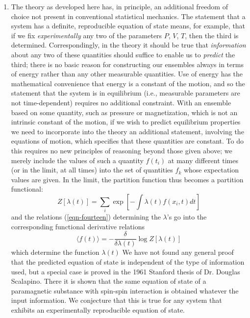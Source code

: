 \documentclass[]{article}
\begin{document}
\begin{enumerate}
\item The theory as developed here has, in principle, an additional freedom of choice not present in conventional statistical mechanics. The statement that a system has a definite, reproducible equation of state means, for example, that if we fix \emph{experimentally} any two of the parameters $P$, $V$, $T$, then the third is determined. Correspondingly, in the theory it should be true that \emph{information} about any two of these quantities should suffice to enable us to \emph{predict} the third; there is no basic reason for constructing our ensembles always in terms of energy rather than any other measurable quantities. Use of energy has the mathematical convenience that energy is a constant of the motion, and so the statement that the system is in equilibrium (i.e., measurable parameters are not time-dependent) requires no additional constraint. With an ensemble based on some quantity, such as pressure or magnetization, which is not an intrinsic constant of the motion, if we wish to predict equilibrium properties we need to incorporate into the theory an additional statement, involving the equations of motion, which specifies that these quantities are constant. To do this requires no new principles of reasoning beyond those given above; we merely include the values of such a quantity $f \left( t _{ i }\right)$ at many different times (or in the limit, at all times) into the set of quantities $f _{ k }$ whose expectation values are given. In the limit, the partition function thus becomes a partition functional:
\begin{equation}
Z [\lambda( t )]=\sum_{ i } \exp \left[-\int \lambda( t ) f \left( x _{ i }, t \right) d t \right] \label{eqn-fifty}
\end{equation}
and the relations (\ref{eqn-fourteen}) determining the $\lambda$'s go into the corresponding functional derivative relations
\begin{equation}
\langle f(t)\rangle=-\frac{\delta}{\delta \lambda(t)} \log Z[\lambda(t)] \label{eqn-fifty-one}
\end{equation}
which determine the function $\lambda(t)$ We have not found any general proof that the predicted equation of state is independent of the type of information used, but a special case is proved in the 1961 Stanford thesis of Dr. Douglas Scalapino. There it is shown that the same equation of state of a paramagnetic substance with spin-spin interaction is obtained whatever the input information. We conjecture that this is true for any system that exhibits an experimentally reproducible equation of state.


\end{enumerate}
\end{document}
